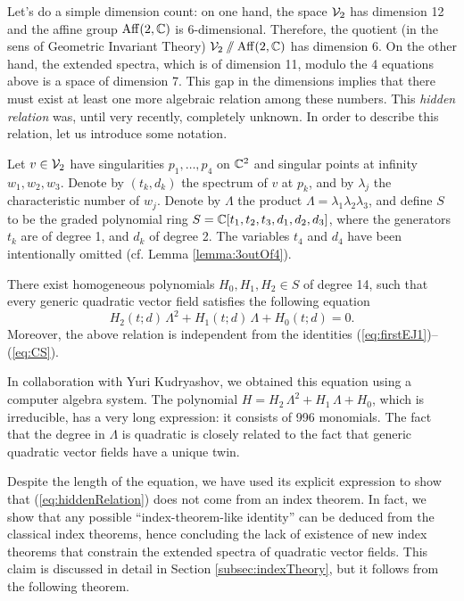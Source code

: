 \documentclass[phd,tocprelim]{cornell}
\begin{document}
Let's do a simple dimension count: on one hand, the space $\mathcal{V}_2$ has dimension 12 and the affine group $\operatorname{Aff}({2},{\mathbb{C}})$ is 6-dimensional. Therefore, the quotient (in the sens of Geometric Invariant Theory) $\mathcal{V}_2\sslash\operatorname{Aff}({2},{\mathbb{C}})$ has dimension 6. On the other hand, the extended spectra, which is of dimension 11, modulo the 4 equations above is a space of dimension 7. This gap in the dimensions implies that there must exist at least one more algebraic relation among these numbers. This \textit{hidden relation} was, until very recently, completely unknown. In order to describe this relation, let us introduce some notation.

Let $v\in\mathcal{V}_2$ have singularities $p_1,\ldots,p_4$ on $\mathbb{C}^2$ and singular points at infinity $w_1,w_2,w_3$. Denote by $(t_k,d_k)$ the spectrum of $v$ at $p_k$, and by $\lambda_j$ the characteristic number of $w_j$. Denote by $\Lambda$ the product $\Lambda=\lambda_1\lambda_2\lambda_3$, and define $S$ to be the graded polynomial ring $S=\mathbb{C}[t_1,t_2,t_3,d_1,d_2,d_3]$, where the generators $t_k$ are of degree 1, and $d_k$ of degree 2. The variables $t_4$ and $d_4$ have been intentionally omitted (cf. Lemma \ref{lemma:3outOf4}).

\begin{theorem}\label{thm:hiddenRelation}
 There exist homogeneous polynomials $H_0,H_1,H_2\in S$ of degree 14, such that every generic quadratic vector field satisfies the following equation
  \begin{equation}\label{eq:hiddenRelation}
   H_2(t;d)\,\Lambda^2+H_1(t;d)\,\Lambda+H_0(t;d)=0 .
  \end{equation}
 Moreover, the above relation is independent from the identities (\ref{eq:firstEJ1})--(\ref{eq:CS}).
\end{theorem}

In collaboration with Yuri Kudryashov, we obtained this equation using a computer algebra system. The polynomial $H=H_2\,\Lambda^2+H_1\,\Lambda+H_0$, which is irreducible, has a very long expression: it consists of 996 monomials. The fact that the degree in $\Lambda$ is quadratic is closely related to the fact that generic quadratic vector fields have a unique twin. 

Despite the length of the equation, we have used its explicit expression to show that (\ref{eq:hiddenRelation}) does not come from an index theorem. In fact, we show that any possible ``index-theorem-like identity'' can be deduced from the classical index theorems, hence concluding the lack of existence of new index theorems that constrain the extended spectra of quadratic vector fields. This claim is discussed in detail in Section \ref{subsec:indexTheory}, but it follows from the following theorem.
\end{document}
